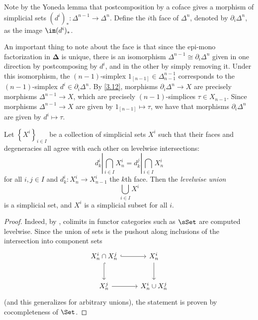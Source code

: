 \begin{definition}\label{4.4}
	Note by the Yoneda lemma that postcomposition by a coface gives a morphism of simplicial sets $(d^i)_*: \Delta ^{n-1}  \to \Delta^n$. Define the $i$th face of $\Delta ^n$, denoted by $\partial _i\Delta ^n$, as the image $\im (d^i)_*$.
\end{definition}

\begin{remark}\label{4.5}
	An important thing to note about the face is that since the epi-mono factorization in $\boldsymbol{\Delta} $ is unique, there is an isomorphism $\Delta ^{n-1} \cong \partial _i\Delta ^n$ given in one direction by postcomposing by $d^i$, and in the other by simply removing it. Under this isomorphism, the $(n-1)$-simplex $1_{[n-1]} \in\Delta ^{n-1}_{n-1} $ corresponds to the $(n-1)$-simplex $d^i\in \partial _i\Delta ^{n} $. By \cref{3.12}, morphisms $\partial _i\Delta ^{n} \to X$ are precisely morphisms $\Delta ^{n-1} \to X$, which are precisely $(n-1)$-simplices $\tau \in X_{n-1} $. Since morphisms $\Delta ^{n-1} \to X$ are given by $1_{[n-1]} \mapsto \tau$, we have that morphisms $\partial _i\Delta ^n$ are given by $d^i\mapsto \tau $.
\end{remark}

\begin{proposition}\label{4.6}
	Let $\left\{ X^i \right\}_{i\in I} $ be a collection of simplicial sets $X^i$ such that their faces and degeneracies all agree with each other on levelwise intersections:
	\[
		d^i_k| \bigcap_{i\in I} X^i_n = d^j_k | \bigcap_{i\in I} X^i_n
	\]
	for all $i,j\in I$ and $d^i_k : X^i_n \to X^i_{n-1} $ the $k$th face. Then the \emph{levelwise union}
	\[
		\bigcup_{i\in I} X^i
	\]
	is a simplicial set, and $X^i$ is a simplicial subset for all $i$.
\end{proposition}
\begin{proof}
	Indeed, by \cite[\S5.3~Thm.~1]{ml}, colimits in functor categories such as $\sSet $ are computed levelwise. Since the union of sets is the pushout along inclusions of the intersection into component sets
	\[\begin{tikzcd}[row sep = 2.5em, column sep = 2.5em]
	X^i_n \cap X^j_n \ar[hook, r] \ar[hook, d]  & X^i_n \ar[d]  \\
	X^j_n \ar[r]  & X^i_n \cup X^j_n
	\end{tikzcd}\]
	(and this generalizes for arbitrary unions), the statement is proven by cocompleteness of $\Set $.
\end{proof}


